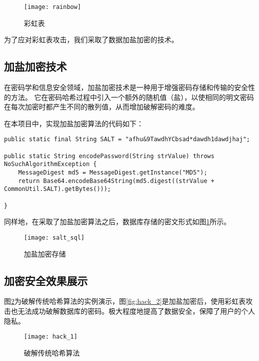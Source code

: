 \begin{figure}[htbp]
	\centering
	\texttt{[image: rainbow]}
	\caption{彩虹表}
	\vspace{\baselineskip}
\end{figure}

为了应对彩虹表攻击，我们采取了数据加盐加密的技术。

\subsection{加盐加密技术}

在密码学和信息安全领域，加盐加密技术是一种用于增强密码存储和传输的安全性的方法。
它在密码哈希过程中引入一个额外的随机值（盐），以使相同的明文密码在每次加密时都产生不同的散列值，从而增加破解密码的难度。

在本项目中，实现加盐加密算法的代码如下：

\begin{lstlisting}[basicstyle=\footnotesize]
public static final String SALT = "afhu&9TawdhYCbsad*dawdh1dawdjhaj";

public static String encodePassword(String strValue) throws NoSuchAlgorithmException {
	MessageDigest md5 = MessageDigest.getInstance("MD5");
	return Base64.encodeBase64String(md5.digest((strValue + CommonUtil.SALT).getBytes()));

}
\end{lstlisting}

同样地，在采取了加盐加密算法之后，数据库存储的密文形式如图\ref{fig:salt-sql}所示。

\begin{figure}[htbp]
	\centering
	\texttt{[image: salt\_sql]}
	\caption{加盐加密存储}
	\label{fig:salt-sql}
	\vspace{\baselineskip}
\end{figure}

\subsection{加密安全效果展示}

图\ref{fig:hack_1}为破解传统哈希算法的实例演示，图\ref{fig:hack_2}是加盐加密后，使用彩虹表攻击也无法成功破解数据库的密码。极大程度地提高了数据安全，保障了用户的个人隐私。

\begin{figure}[htbp]
	\centering
	\texttt{[image: hack\_1]}
	\caption{破解传统哈希算法}
	\label{fig:hack_1}
	\vspace{\baselineskip}
\end{figure}


